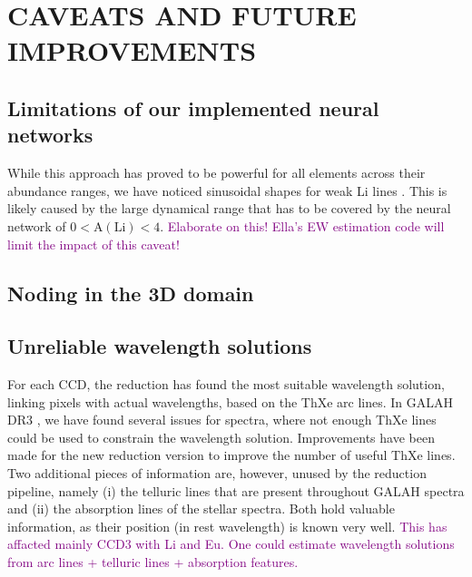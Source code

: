 \documentclass[
  journal=pasa,
  manuscript=research-paper, %
  year=2023,
  volume=37
]{cup-journal}
\newcommand{\SB}[1]{{\textcolor{purple}{#1}}}
\begin{document}

\section{CAVEATS AND FUTURE IMPROVEMENTS}

\subsection{Limitations of our implemented neural networks}

While this approach has proved to be powerful for all elements across their abundance ranges, we have noticed sinusoidal shapes for weak Li lines \citep[see also][]{Wang2020}. This is likely caused by the large dynamical range that has to be covered by the neural network of $0 < \mathrm{A(Li)} < 4$. \SB{Elaborate on this! Ella's EW estimation code will limit the impact of this caveat!}

\subsection{Noding in the 3D domain}



\subsection{Unreliable wavelength solutions}

For each CCD, the reduction has found the most suitable wavelength solution, linking pixels with actual wavelengths, based on the ThXe arc lines. In GALAH DR3 \citep{Buder2021}, we have found several issues for spectra, where not enough ThXe lines could be used to constrain the wavelength solution. Improvements have been made for the new reduction version to improve the number of useful ThXe lines. Two additional pieces of information are, however, unused by the reduction pipeline, namely (i) the telluric lines that are present throughout GALAH spectra and (ii) the absorption lines of the stellar spectra. Both hold valuable information, as their position (in rest wavelength) is known very well. \SB{This has affacted mainly CCD3 with Li and Eu. One could estimate wavelength solutions from arc lines + telluric lines + absorption features.}
\end{document}

